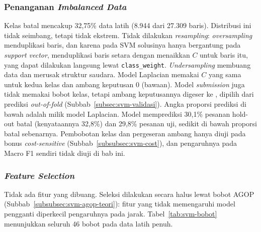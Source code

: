 \subsubsection{Penanganan \textit{Imbalanced Data}}
Kelas batal mencakup 32,75\% data latih (8.944 dari 27.309 baris). Distribusi ini tidak seimbang, tetapi tidak ekstrem. Tidak dilakukan \textit{resampling}: \textit{oversampling} menduplikasi baris, dan karena pada SVM solusinya hanya bergantung pada \textit{support vector}, menduplikasi baris setara dengan menaikkan $C$ untuk baris itu, yang dapat dilakukan langsung lewat \texttt{class\_weight}. \textit{Undersampling} membuang data dan merusak struktur saudara. Model Laplacian memakai $C$ yang sama untuk kedua kelas dan ambang keputusan 0 (bawaan). Model \textit{submission} juga tidak memakai bobot kelas, tetapi ambang keputusannya digeser ke \SVMBaruAmbang{}, dipilih dari prediksi \textit{out-of-fold} (Subbab~\ref{subsec:svm-validasi}). Angka proporsi prediksi di bawah adalah milik model Laplacian. Model memprediksi 30,1\% pesanan hold-out batal (kenyataannya 32,8\%) dan 29,8\% pesanan uji, sedikit di bawah proporsi batal sebenarnya. Pembobotan kelas dan pergeseran ambang hanya diuji pada bonus \textit{cost-sensitive} (Subbab~\ref{subsubsec:svm-cost}), dan pengaruhnya pada Macro F1 sendiri tidak diuji di bab ini.

\subsubsection{\textit{Feature Selection}}
Tidak ada fitur yang dibuang. Seleksi dilakukan secara halus lewat bobot AGOP (Subbab~\ref{subsubsec:svm-agop-teori}): fitur yang tidak memengaruhi model pengganti diperkecil pengaruhnya pada jarak. Tabel~\ref{tab:svm-bobot} menunjukkan seluruh 46 bobot pada data latih penuh.

